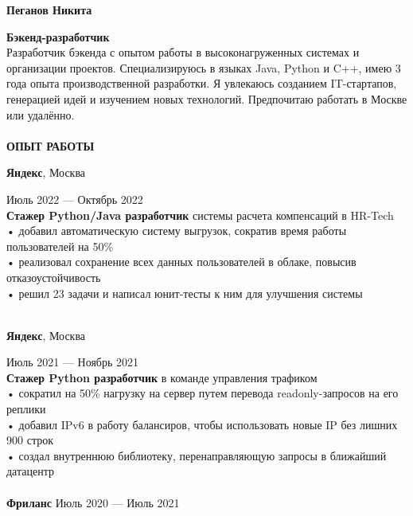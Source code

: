 \documentclass{article}
\begin{document}
\begin{vwcol}[widths={0.8,0.2},
 sep=.8cm, justify=flush,rule=0pt,indent=1em] 
\begin{spacing}{1.1}
\noindent\textbf{\Huge{Пеганов Никита}}\\
\end{spacing}
\noindent\textcolor[rgb]{0.1255,0.2902,0.7843}{\textbf{\Large{Бэкенд-разработчик}}}\\
Разработчик бэкенда с опытом работы в высоконагруженных системах и организации проектов. Специализируюсь в языках Java, Python и C++, имею 3 года опыта производственной разработки. Я увлекаюсь созданием IT-стартапов, генерацией идей и изучением новых технологий. Предпочитаю работать в Москве или удалённо.\\
\\
\noindent\textcolor[rgb]{0.1255,0.2902,0.7843}{\textbf{\Large{ОПЫТ РАБОТЫ}}}\\
\begin{Large}
\textbf{Яндекс}, Москва
\end{Large}
\hspace{185pt}Июль 2022 — Октябрь 2022\\
\textbf{Стажер Python/Java разработчик} системы расчета компенсаций в HR-Tech\\
• добавил автоматическую систему выгрузок, сократив время работы пользователей на 50\%\\
• реализовал сохранение всех данных пользователей в облаке, повысив отказоустойчивость\\
• решил 23 задачи и написал юнит-тесты к ним для улучшения системы\\
\\
\begin{Large}
\textbf{Яндекс}, Москва
\end{Large}
\hspace{190pt}Июль 2021 — Ноябрь 2021\\
\textbf{Стажер Python разработчик} в команде управления трафиком\\
• сократил на 50\% нагрузку на сервер путем перевода readonly-запросов на его реплики\\
• добавил IPv6 в работу балансиров, чтобы использовать новые IP без лишних 900 строк\\
• создал внутреннюю библиотеку, перенаправляющую запросы в ближайший датацентр\\
\\
\textbf{\Large{Фриланс}}
\hspace{250pt}Июль 2020 — Июль 2021\\ 

\end{vwcol}
\end{document}
